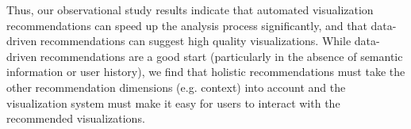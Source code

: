Thus, our observational study results indicate that automated visualization recommendations can speed up the analysis process significantly, and that data-driven recommendations can suggest high quality visualizations.
While data-driven recommendations are a good start (particularly in the absence of semantic information or user history), we find that holistic recommendations must take the other recommendation dimensions (e.g. context) into account and the visualization system must make it easy for users to interact with the recommended visualizations.





